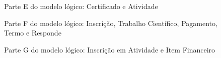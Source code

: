 \begin{figure}[h!]
\centering
\logE
\caption{Parte E do modelo lógico: Certificado e Atividade}
\label{fig:logE}
\end{figure}

\begin{figure}[h!]
\centering
\logF
\caption{Parte F do modelo lógico: Inscrição, Trabalho Científico, Pagamento, Termo e Responde}
\label{fig:logF}
\end{figure}

\begin{figure}[h!]
\centering
\logG
\caption{Parte G do modelo lógico: Inscrição em Atividade e Item Financeiro}
\label{fig:logG}
\end{figure}

\FloatBarrier

